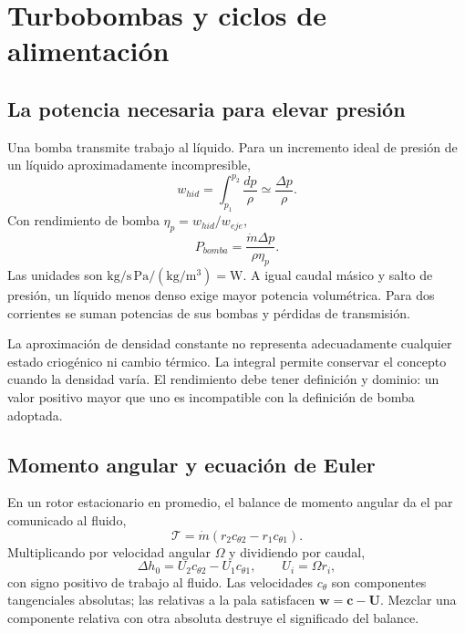 \chapter{Turbobombas y ciclos de alimentación}\label{ch:19}
\section{La potencia necesaria para elevar presión}
Una bomba transmite trabajo al líquido. Para un incremento ideal de presión de un líquido aproximadamente incompresible,
\[
 w_{hid}=\int_{p_1}^{p_2}\frac{dp}{\rho}\simeq\frac{\Delta p}{\rho}.
\]
Con rendimiento de bomba $\eta_p=w_{hid}/w_{eje}$,
\begin{equation}\label{eq:pumppower}
 P_{bomba}=\frac{\dot m\Delta p}{\rho\eta_p}.
\end{equation}
Las unidades son $\mathrm{kg/s}\,\mathrm{Pa}/(\mathrm{kg/m^3})=\mathrm W$. A igual caudal másico y salto de presión, un líquido menos denso exige mayor potencia volumétrica. Para dos corrientes se suman potencias de sus bombas y pérdidas de transmisión.

La aproximación de densidad constante no representa adecuadamente cualquier estado criogénico ni cambio térmico. La integral permite conservar el concepto cuando la densidad varía. El rendimiento debe tener definición y dominio: un valor positivo mayor que uno es incompatible con la definición de bomba adoptada.\cite{MIT25,MIT26}
\section{Momento angular y ecuación de Euler}
En un rotor estacionario en promedio, el balance de momento angular da el par comunicado al fluido,
\[
 \mathcal T=\dot m(r_2c_{\theta2}-r_1c_{\theta1}).
\]
Multiplicando por velocidad angular $\Omega$ y dividiendo por caudal,
\begin{equation}\label{eq:euler}
 \Delta h_0=U_2c_{\theta2}-U_1c_{\theta1},\qquad U_i=\Omega r_i,
\end{equation}
con signo positivo de trabajo al fluido. Las velocidades $c_\theta$ son componentes tangenciales absolutas; las relativas a la pala satisfacen $\mathbf w=\mathbf c-\mathbf U$. Mezclar una componente relativa con otra absoluta destruye el significado del balance.

